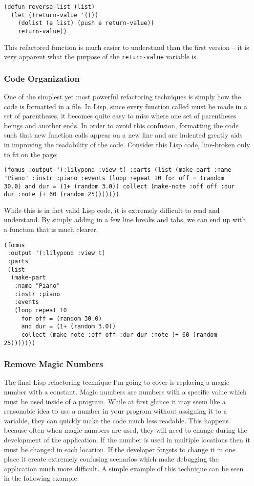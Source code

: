 \documentclass{article}
\begin{document}
\begin{verbatim}
(defun reverse-list (list)
  (let ((return-value '()))
    (dolist (e list) (push e return-value))
    return-value))
\end{verbatim}

This refactored function is much easier to understand than the first version -- it is very apparent what the purpose of the \verb!return-value! variable is.

\subsubsection{Code Organization}

One of the simplest yet most powerful refactoring techniques is simply how the code is formatted in a file. In Lisp, since every function called must be made in a set of parentheses, it becomes quite easy to miss where one set of parentheses beings and another ends. In order to avoid this confusion, formatting the code such that new function calls appear on a new line and are indented greatly aids in improving the readability of the code. Consider this Lisp code, line-broken only to fit on the page:

\begin{verbatim}
(fomus :output '(:lilypond :view t) :parts (list (make-part :name 
"Piano" :instr :piano :events (loop repeat 10 for off = (random 
30.0) and dur = (1+ (random 3.0)) collect (make-note :off off :dur 
dur :note (+ 60 (random 25)))))))
\end{verbatim}

While this is in fact valid Lisp code, it is extremely difficult to read and understand. By simply adding in a few line breaks and tabs, we can end up with a function that is much clearer.

\begin{verbatim}
(fomus
 :output '(:lilypond :view t)
 :parts
 (list
  (make-part
   :name "Piano"
   :instr :piano
   :events
   (loop repeat 10
	 for off = (random 30.0)
	 and dur = (1+ (random 3.0))
	 collect (make-note :off off :dur dur :note (+ 60 (random 25)))))))
\end{verbatim}

\subsubsection{Remove Magic Numbers}
 
The final Lisp refactoring technique I’m going to cover is replacing a magic number with a constant. Magic numbers are numbers with a specific value which must be used inside of a program. While at first glance it may seem like a reasonable idea to use a number in your program without assigning it to a variable, they can quickly make the code much less readable. This happens because often when magic numbers are used, they will need to change during the development of the application. If the number is used in multiple locations then it must be changed in each location. If the developer forgets to change it in one place it create extremely confusing scenarios which make debugging the application much more difficult. A simple example of this technique can be seen in the following example.
 
\end{document}
